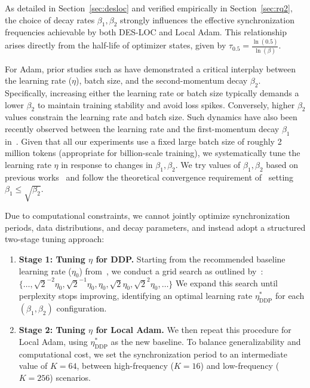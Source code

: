 As detailed in Section~\ref{sec:desloc} and verified empirically in Section~\ref{sec:rq2}, the choice of decay rates $\beta_1, \beta_2$
strongly influences the effective synchronization frequencies achievable by both DES-LOC and
Local Adam. This relationship arises directly from the half-life of optimizer states, given by
$\tau_{0.5} = \frac{\ln(0.5)}{\ln(\beta)}$.

For Adam, prior studies such as \citet{wortsman2023stable} have demonstrated a critical interplay between the learning rate ($\eta$), batch size, and the second-momentum decay $\beta_2$. Specifically, increasing either the learning rate or batch size typically demands a lower $\beta_2$ to maintain training stability and avoid loss spikes. Conversely, higher $\beta_2$ values constrain the learning rate and batch size. Such dynamics have also been recently observed between the learning rate and the first-momentum decay $\beta_1$ in~\citet{pagliardini2025ademamix}. Given that all our experiments use a fixed large batch size of roughly 2 million tokens (appropriate for billion-scale training), we systematically tune the learning rate $\eta$ in response to changes in $\beta_1, \beta_2$. We try values of $\beta_1, \beta_2$ based on previous works~\citep{zhang2025critical} and follow the theoretical convergence requirement of~\citet{zhang2022adam} setting $\beta_1 \leq \sqrt{\beta_2}$.

Due to computational constraints, we cannot jointly optimize synchronization periods, data distributions, and decay parameters, and instead adopt a structured two-stage tuning approach:
\begin{enumerate}
    \item \textbf{Stage 1: Tuning $\eta$ for DDP.} Starting from the recommended baseline learning rate ($\eta_0$)
    from~\citet{allal2025smollm2}, we conduct a grid search as outlined by~\citet{charles2025communication}:
    $\{\ldots, \sqrt{2}^{-2}\eta_0, \sqrt{2}^{-1}\eta_0, \eta_0, \sqrt{2}\eta_0, \sqrt{2}^2\eta_0, \ldots\}$
    We expand this search until perplexity stops improving, identifying an optimal learning rate $\eta^*_{\text{DDP}}$ for each $(\beta_1, \beta_2)$ configuration.

    \item \textbf{Stage 2: Tuning $\eta$ for Local Adam.} We then repeat this procedure for Local Adam,
    using $\eta^*_{\text{DDP}}$ as the new baseline. To balance generalizability and computational cost, we set
    the synchronization period to an intermediate value of $K = 64$, between high-frequency ($K = 16$) and low-frequency ($K = 256$) scenarios.
\end{enumerate}

